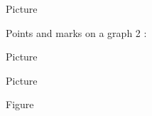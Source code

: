 Picture 
\begin{center}

\end{center}


Points and marks on a graph 2 :

Picture 
\begin{center}

\end{center}


Picture 
\begin{center}

\end{center}



Figure 
\begin{center}

\end{center}

